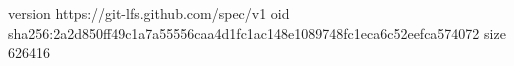 version https://git-lfs.github.com/spec/v1
oid sha256:2a2d850ff49c1a7a55556caa4d1fc1ac148e1089748fc1eca6c52eefca574072
size 626416
